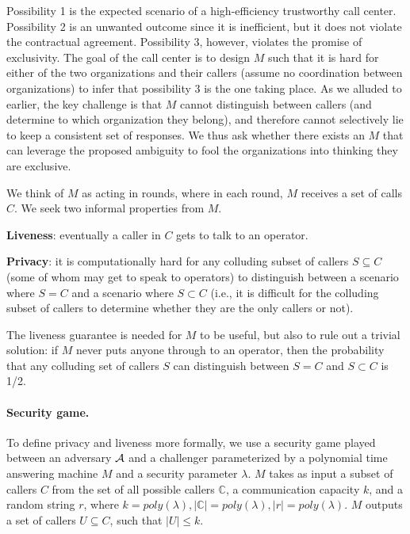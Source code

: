 Possibility 1 is the expected scenario of a high-efficiency trustworthy
  call center.
Possibility 2 is an unwanted outcome since it is inefficient, but
  it does not violate the contractual agreement.
Possibility 3, however, violates the promise of exclusivity.
The goal of the call center is to design $M$ such that it is 
  hard for either of the two organizations and their callers (assume no
  coordination between organizations) to infer that possibility 3 is the one 
  taking place.
As we alluded to earlier, the key challenge is that $M$ cannot distinguish 
  between callers (and determine to which organization they belong), and 
  therefore cannot selectively lie to keep a consistent set of responses.
We thus ask whether there exists an $M$ that can leverage the proposed
  ambiguity to fool the organizations into thinking they are exclusive.

We think of $M$ as acting in rounds, where in each round, $M$ receives
  a set of calls $C$.
We seek two informal properties from $M$.
\begin{myitemize}
\item \textbf{Liveness}: eventually a caller in $C$ gets to 
  talk to an operator.
\item \textbf{Privacy}: it is computationally hard for any colluding subset of 
  callers $S \subseteq C$ (some of whom may get to speak to operators) to 
  distinguish between a scenario where $S = C$ and a scenario 
  where $S \subset C$ (i.e., it is difficult for the colluding subset of 
  callers to determine whether they are the only callers or not).
\end{myitemize}

The liveness guarantee is needed for $M$ to be useful, but also 
  to rule out a trivial solution: if $M$ never puts anyone through to an
  operator, then the probability that any colluding set of callers $S$ can
  distinguish between $S = C$ and $S \subset C$ is 1/2.

\paragraph{Security game.}
To define privacy and liveness more formally, we use a security game played
  between an adversary $\mathcal{A}$ and a challenger parameterized by
  a polynomial time answering machine $M$ and a security parameter $\lambda$.
$M$ takes as input a subset of callers $C$ from the set of all possible callers
  $\mathbb{C}$, a communication capacity $k$, and a random string $r$, where 
  $k = poly(\lambda), |\mathbb{C}| = poly(\lambda), |r| = poly(\lambda)$.
$M$ outputs a set of callers $U \subseteq C$, such that $|U| \leq k$.


